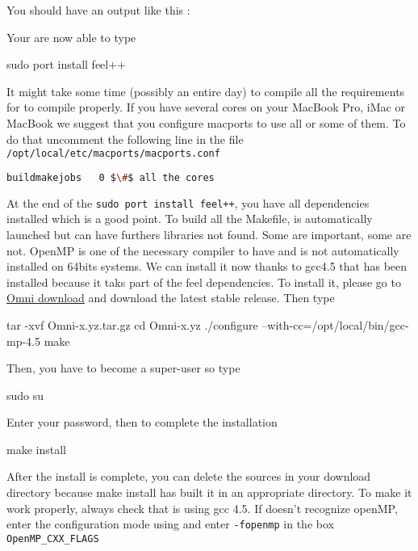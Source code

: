 You should have an output like this :
\begin{flushleft}
\end{flushleft}
Your are now able to type
\begin{unixcom}
		sudo port install feel++
\end{unixcom}
It might take some time (possibly an entire day) to compile all the requirements for \feel
to compile properly. If you have several cores on your MacBook Pro, iMac or MacBook
we suggest that you configure macports to use all or some of them.
To do that uncomment the following line in the file  \verb|/opt/local/etc/macports/macports.conf|
\begin{flushleft}
\begin{lstlisting}[language=sh]
buildmakejobs	0 $\#$ all the cores
\end{lstlisting}
\end{flushleft}
At the end of the \verb|sudo port install feel++|, you have all dependencies installed which is a good point. To build all the Makefile, \cmake is automatically launched but can have furthers libraries not found. Some are important, some are not. OpenMP is one of the necessary compiler to have and is not automatically installed on 64bits systems. We can install it now thanks to gcc4.5 that has been installed because it taks part of the feel dependencies. To install it, please go to \href{http://www.hpcs.cs.tsukuba.ac.jp/omni-openmp/download/download-omni.html}{Omni download} and download the latest stable release. Then type
\begin{unixcom}
		tar -xvf Omni-x.yz.tar.gz
		cd  Omni-x.yz
		./configure --with-cc=/opt/local/bin/gcc-mp-4.5
		make
\end{unixcom}
Then, you have to become a super-user so type
\begin{unixcom}
		sudo su
\end{unixcom}
Enter your password, then to complete the installation
\begin{unixcom}
		make install
\end{unixcom}
After the install is complete, you can delete the sources in your download directory because make install has built it in an appropriate directory. To make it work properly, always check that \cmake is using gcc 4.5. If \cmake doesn't recognize openMP, enter the configuration mode using \ccmake and enter \verb|-fopenmp| in the box \verb|OpenMP_CXX_FLAGS|

